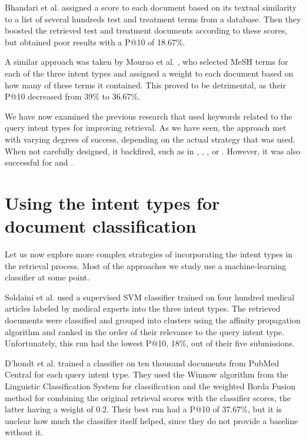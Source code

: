 Bhandari et al. \cite{ir.cs.sfsu} assigned a score to each document based on
its textual similarity to a list of several hundreds test and treatment terms from a database.
Then they boosted the retrieved test and treatment documents according to these scores, but obtained
poor results with a P@10 of 18.67\%.

A similar approach was taken by Mourao et al. \cite{novasearch}, who selected MeSH
terms for each of the three intent types and assigned a weight to each
document based on how many of these terms it contained.
This proved to be detrimental, as their P@10 decreased from 39\% to 36.67\%.

We have now examined the previous research that used keywords related to the query intent types for improving
retrieval. As we have seen, the approach met with varying degrees of success, depending on the actual
strategy that was used. When not carefully designed, it backfired, such as in \cite{novasearch}, \cite{cuhk},
\cite{CSEIITV}, \cite{ir.cs.sfsu}  or \cite{duth}. However, it was also successful for \cite{bitem} and \cite{udel}.

\section{Using the intent types for document classification}
Let us now explore more complex strategies of incorporating the intent types in the retrieval process.
Most of the approaches we study use a machine-learning classifier at some point.

Soldaini et al. \cite{soldani} used a supervised SVM classifier trained on four hundred medical articles
labeled by medical experts into the three intent types. The retrieved documents were classified 
and grouped into clusters using the affinity propagation algorithm and ranked in the order of their relevance
to the query intent type. Unfortunately, this run had the lowest P@10, 18\%, out of their five submissions.

D’hondt et al. \cite{limsi2015} trained a classifier on ten thousand documents from PubMed Central
for each query intent type. They used the Winnow algorithm from the Linguistic Classification System
for classification and the weighted Borda Fusion method for combining the original retrieval scores
with the classifier scores, the latter having a weight of 0.2. Their best run had a P@10 of 37.67\%,
but it is unclear how much the classifier itself helped, since they do not provide a baseline without it.

